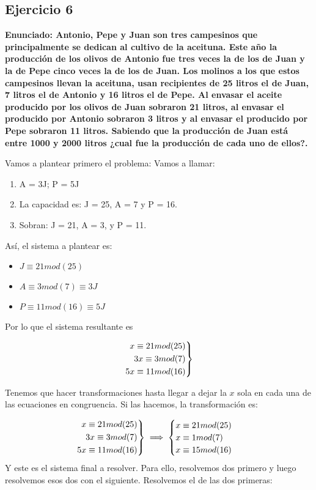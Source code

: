 \documentclass[11pt, a4paper, titlepage]{article}
\newenvironment{rcases}
  {\left.\begin{aligned}}
  {\end{aligned}\right\rbrace}
\begin{document}
\subsection{\LARGE{Ejercicio 6}}
\textbf{Enunciado: Antonio, Pepe y Juan son tres campesinos que principalmente se
dedican al cultivo de la aceituna. Este año la producción de los olivos de
Antonio fue tres veces la de los de Juan y la de Pepe cinco veces la de los
de Juan. Los molinos a los que estos campesinos llevan la aceituna, usan
recipientes de 25 litros el de Juan, 7 litros el de Antonio y 16 litros el de
Pepe. Al envasar el aceite producido por los olivos de Juan sobraron 21
litros, al envasar el producido por Antonio sobraron 3 litros y al envasar el
producido por Pepe sobraron 11 litros. Sabiendo que la producción de Juan
está entre 1000 y 2000 litros ¿cual fue la producción de cada uno de ellos?.}

Vamos a plantear primero el problema: Vamos a llamar:
\begin{enumerate}
	\item A = 3J; P = 5J
	\item La capacidad es: J = 25, A = 7 y P = 16.
	\item Sobran: J = 21, A = 3, y P = 11.
\end{enumerate}

Así, el sistema a plantear es:

\begin{itemize}
	\item $J \equiv 21 mod(25)$
	\item $A \equiv 3 mod(7) \equiv 3J$
	\item $P \equiv 11 mod(16) \equiv 5J$
\end{itemize}

Por lo que el sistema resultante es

\[
\begin{rcases}
	x \equiv 21 mod(25)\\
	3x \equiv 3 mod(7)\\
	5x \equiv 11 mod(16)
\end{rcases}
\]

Tenemos que hacer transformaciones hasta llegar a dejar la $x$ sola en cada una de las ecuaciones en congruencia. Si las hacemos, la transformación es:



\[
\begin{rcases}
	x \equiv 21 mod(25)\\
	3x \equiv 3 mod(7)\\
	5x \equiv 11 mod(16)
\end{rcases} \implies \begin{cases}
	 x \equiv 21 mod(25)\\
	 x \equiv 1 mod(7)\\
	 x \equiv 15 mod(16)
\end{cases}
\]
Y este es el sistema final a resolver. Para ello, resolvemos dos primero y luego resolvemos esos dos con el siguiente. Resolvemos el de las dos primeras:
\end{document}
